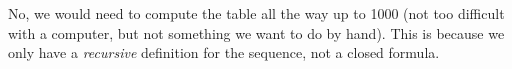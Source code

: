 \documentclass[11pt]{exam}
\begin{document}
\begin{questions}
  \begin{solution}
  No, we would need to compute the table all the way up to 1000 (not too difficult with a computer, but not something we want to do by hand).  This is because we only have a \emph{recursive} definition for the sequence, not a closed formula.
  \end{solution}
\end{questions}
\end{document}
